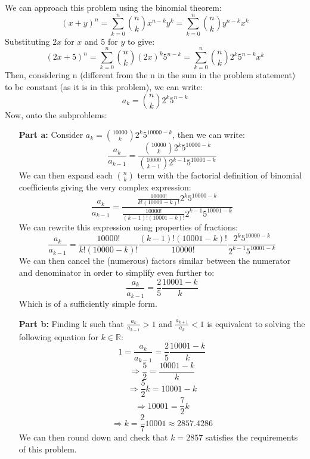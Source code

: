\documentclass[11pt]{amsart}
\begin{document}
\begin{solution}

We can approach this problem using the binomial theorem:
$$(x+y)^n = \sum_{k=0}^n \binom{n}{k} x^{n-k} y^k = \sum_{k=0}^n \binom{n}{k} y^{n-k} x^k$$
Substituting $2x$ for $x$ and $5$ for $y$ to give:
$$(2x+5)^n = \sum_{k=0}^n \binom{n}{k} (2x)^k 5^{n-k} = \sum_{k=0}^n \binom{n}{k} 2^k 5^{n-k} x^k$$
Then, considering n (different from the n in the sum in the problem statement) to be constant (as it is in this problem), we can write:
$$a_k = \binom{n}{k} 2^k 5^{n-k}$$
Now, onto the subproblems:

\begin{itemize}
	\item[\textbf{Part a:}]{}
		Consider $a_k = \binom{10000}{k} 2^k 5^{10000-k}$, then we can write:
		$$\frac{a_k}{a_{k-1}} = \frac{\binom{10000}{k} 2^k 5^{10000-k}}{\binom{10000}{k-1} 2^{k-1} 5^{10001-k}}$$
		We can then expand each $\binom{n}{k}$ term with the factorial definition of binomial coefficients giving the very complex expression:
		$$\frac{a_k}{a_{k-1}} = \frac{\frac{10000!}{k!(10000-k)!} 2^k 5^{10000-k}}{\frac{10000!}{(k-1)!(10001-k)!} 2^{k-1} 5^{10001-k}}$$
		We can rewrite this expression using properties of fractions:
		$$\frac{a_k}{a_{k-1}} = \frac{10000!}{k!(10000-k)!} \frac{(k-1)!(10001-k)!}{10000!} \frac{2^k 5^{10000-k}}{2^{k-1} 5^{10001-k}}$$
		We can then cancel the (numerous) factors similar between the numerator and denominator in order to simplify even further to:
		$$\frac{a_k}{a_{k-1}} = \frac{2}{5}\frac{10001-k}{k}$$
		Which is of a sufficiently simple form.
		\vskip 0.15in
	\item[\textbf{Part b:}]{} Finding k such that $\frac{a_k}{a_{k-1}} > 1$ and $\frac{a_{k+1}}{a_k} < 1$ is equivalent to solving the following equation for $k \in \mathbb{R}$:
		$$1 = \frac{a_k}{a_{k-1}} = \frac{2}{5} \frac{10001-k}{k}$$
		$$\Rightarrow \frac{5}{2} = \frac{10001-k}{k}$$
		$$\Rightarrow \frac{5}{2} k = 10001-k$$
		$$\Rightarrow 10001 = \frac{7}{2}k$$
		$$\Rightarrow k = \frac{2}{7} 10001 \approx	2857.4286$$
		We can then round down and check that $k = 2857$ satisfies the requirements of this problem.
\end{itemize}
\end{solution}
 
\end{document}
